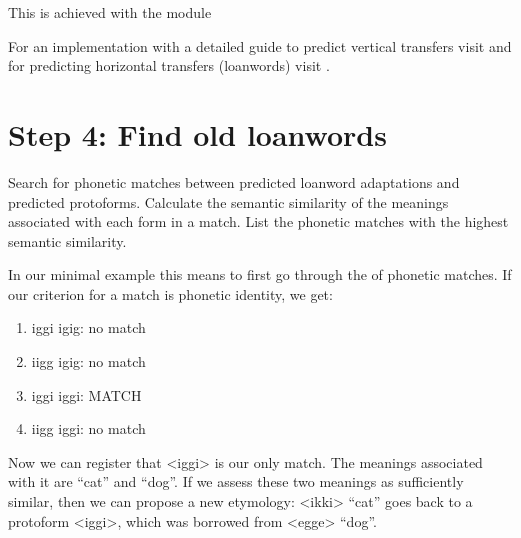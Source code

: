 \documentclass[letterpaper,10pt,english]{sphinxmanual}
\begin{document}
\sphinxAtStartPar
This is achieved with the 
module

\sphinxAtStartPar
For an implementation with a detailed guide to predict vertical transfers visit
 and for
predicting horizontal transfers (loanwords) visit
.


\section{Step 4: Find old loanwords}
\label{\detokenize{tutorial:step-4-find-old-loanwords}}
\sphinxAtStartPar
Search for phonetic matches between predicted loanword adaptations
and predicted proto\sphinxhyphen{}forms. Calculate the semantic similarity of
the meanings associated with each form in a match. List the phonetic matches
with the highest semantic similarity.

\sphinxAtStartPar
In our minimal example this means to first go through the  of phonetic matches.
If our criterion for a match is phonetic identity, we get:
\begin{enumerate}
%
\item {} 
\sphinxAtStartPar
iggi \sphinxhyphen{} igig: no match

\item {} 
\sphinxAtStartPar
iigg \sphinxhyphen{} igig: no match

\item {} 
\sphinxAtStartPar
iggi \sphinxhyphen{} iggi: MATCH

\item {} 
\sphinxAtStartPar
iigg \sphinxhyphen{} iggi: no match

\end{enumerate}

\sphinxAtStartPar
Now we can register that \textless{}iggi\textgreater{} is our only match. The meanings associated
with it are “cat” and “dog”. If we assess these two meanings as sufficiently
similar, then we can propose a new etymology: \textless{}ikki\textgreater{} “cat” goes back to
a proto\sphinxhyphen{}form \textless{}iggi\textgreater{}, which was borrowed from \textless{}egge\textgreater{} “dog”.
\end{document}
